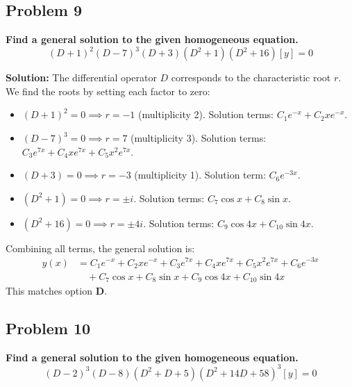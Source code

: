 \documentclass[11pt, a4paper]{article}
\theoremstyle{definition}
\theoremstyle{remark}
\begin{document}
\subsection*{Problem 9}
\textbf{Find a general solution to the given homogeneous equation.}
\[ (D+1)^2 (D-7)^3 (D+3) (D^2+1) (D^2+16)[y] = 0 \]

\textbf{Solution:}
The differential operator $D$ corresponds to the characteristic root $r$. We find the roots by setting each factor to zero:
\begin{itemize}
    \item $(D+1)^2 = 0 \implies r = -1$ (multiplicity 2). Solution terms: $C_1 e^{-x} + C_2 x e^{-x}$.
    \item $(D-7)^3 = 0 \implies r = 7$ (multiplicity 3). Solution terms: $C_3 e^{7x} + C_4 x e^{7x} + C_5 x^2 e^{7x}$.
    \item $(D+3) = 0 \implies r = -3$ (multiplicity 1). Solution term: $C_6 e^{-3x}$.
    \item $(D^2+1) = 0 \implies r = \pm i$. Solution terms: $C_7 \cos x + C_8 \sin x$.
    \item $(D^2+16) = 0 \implies r = \pm 4i$. Solution terms: $C_9 \cos 4x + C_{10} \sin 4x$.
\end{itemize}
Combining all terms, the general solution is:
\begin{align*}
    y(x) &= C_1 e^{-x} + C_2 x e^{-x} + C_3 e^{7x} + C_4 x e^{7x} + C_5 x^2 e^{7x} + C_6 e^{-3x} \\
    &\quad + C_7 \cos x + C_8 \sin x + C_9 \cos 4x + C_{10} \sin 4x
\end{align*}
This matches option \textbf{D}.

\subsection*{Problem 10}
\textbf{Find a general solution to the given homogeneous equation.}
\[ (D-2)^3 (D-8) (D^2+D+5) (D^2+14D+58)^3 [y] = 0 \]
\end{document}
